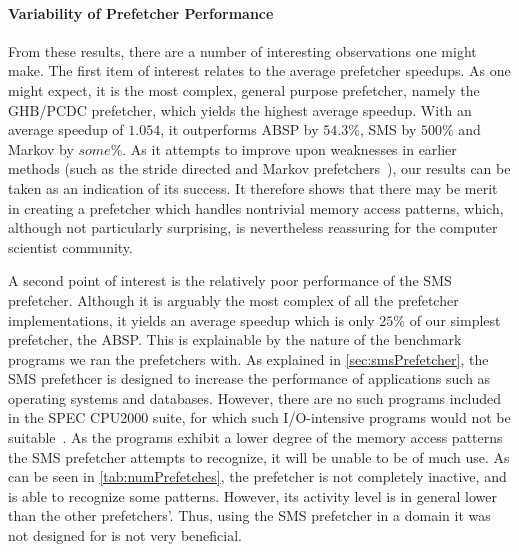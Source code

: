 
\paragraph{Variability of Prefetcher Performance}
\label{par:varprefperf}



From these results, there are a number of interesting observations one
might make. The first item of interest relates to the average
prefetcher speedups. As one might expect, it is the most complex,
general purpose prefetcher, namely the GHB/PCDC prefetcher, which
yields the highest average speedup. With an average speedup of
$1.054$, it outperforms ABSP by $54.3\%$, SMS by $500\%$ and Markov by
$some\%$. As it attempts to improve upon weaknesses in earlier methods
(such as the stride directed and Markov prefetchers~\cite{Nesbit}),
our results can be taken as an indication of its success. It therefore
shows that there may be merit in creating a prefetcher which handles
nontrivial memory access patterns, which, although not particularly
surprising, is nevertheless reassuring for the computer scientist
community.%

A second point of interest is the relatively poor performance of the
SMS prefetcher. Although it is arguably the most complex of all the
prefetcher implementations, it yields an average speedup which is only
$25\%$ of our simplest prefetcher, the ABSP. This is explainable by
the nature of the benchmark programs we ran the prefetchers with. As
explained in \autoref{sec:smsPrefetcher}, the SMS prefethcer is
designed to increase the performance of applications such as operating
systems and databases. However, there are no such programs included in
the SPEC CPU2000 suite, for which such I/O-intensive programs would
not be suitable~\cite{SPECFAQ}. As the programs exhibit a lower
degree of the memory access patterns the SMS prefetcher attempts to
recognize, it will be unable to be of much use. As can be seen in
\autoref{tab:numPrefetches}, the prefetcher is not completely
inactive, and is able to recognize some patterns. However, its
activity level is in general lower than the other prefetchers'. Thus,
using the SMS prefetcher in a domain it was not designed for is not
very beneficial.


